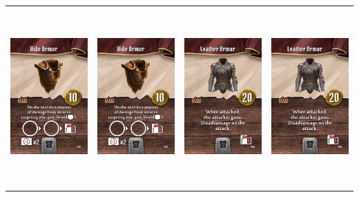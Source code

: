 \documentclass{minimal}
\begin{document}
{\begin{longtable}{llll}
\includegraphics[width=44mm,height=68mm]{./1-14/gh-003-hide-armor.png} &
\includegraphics[width=44mm,height=68mm]{./1-14/gh-003-hide-armor.png} &
\includegraphics[width=44mm,height=68mm]{./1-14/gh-004-leather-armor.png} &
\includegraphics[width=44mm,height=68mm]{./1-14/gh-004-leather-armor.png}\\ 

\end{longtable}}
\end{document}
